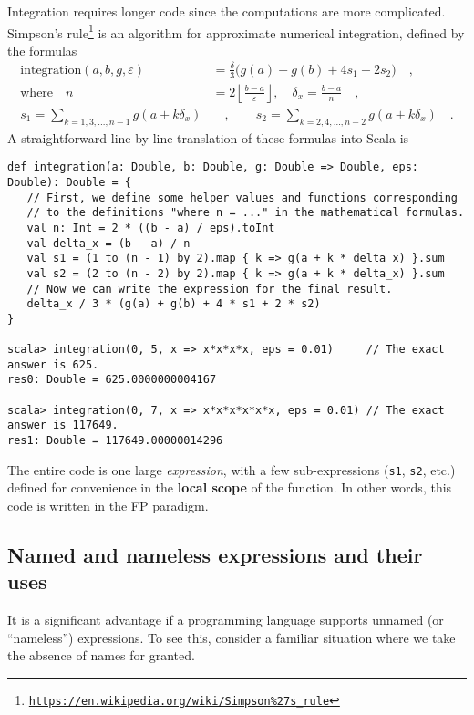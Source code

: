 Integration requires longer code since the computations are more complicated.
Simpson\textsf{'}s rule\footnote{\texttt{\href{https://en.wikipedia.org/wiki/Simpson\%27s_rule}{https://en.wikipedia.org/wiki/Simpson\%27s\_rule}}}
is an algorithm for approximate numerical integration, defined by
the formulas
\begin{align*}
\text{integration}\left(a,b,g,\varepsilon\right) & =\frac{\delta}{3}\big(g(a)+g(b)+4s_{1}+2s_{2}\big)\quad,\\
\text{where }~~~n & =2\left\lfloor \frac{b-a}{\varepsilon}\right\rfloor ,\quad\delta_{x}=\frac{b-a}{n}\quad,\\
s_{1}=\sum_{k=1,3,...,n-1}g(a+k\delta_{x}) & \quad,\quad\quad s_{2}=\sum_{k=2,4,...,n-2}g(a+k\delta_{x})\quad.
\end{align*}
 A straightforward line-by-line translation of these formulas into
Scala is
\begin{lstlisting}
def integration(a: Double, b: Double, g: Double => Double, eps: Double): Double = {
   // First, we define some helper values and functions corresponding
   // to the definitions "where n = ..." in the mathematical formulas.
   val n: Int = 2 * ((b - a) / eps).toInt
   val delta_x = (b - a) / n
   val s1 = (1 to (n - 1) by 2).map { k => g(a + k * delta_x) }.sum
   val s2 = (2 to (n - 2) by 2).map { k => g(a + k * delta_x) }.sum
   // Now we can write the expression for the final result.
   delta_x / 3 * (g(a) + g(b) + 4 * s1 + 2 * s2)
}

scala> integration(0, 5, x => x*x*x*x, eps = 0.01)     // The exact answer is 625.
res0: Double = 625.0000000004167

scala> integration(0, 7, x => x*x*x*x*x*x, eps = 0.01) // The exact answer is 117649.
res1: Double = 117649.00000014296
\end{lstlisting}

The entire code is one large \emph{expression}, with a few sub-expressions
(\lstinline!s1!, \lstinline!s2!, etc.) defined for convenience in
the \textbf{local scope} of the function. In other
words, this code is written in the FP paradigm.

\subsection{Named and nameless expressions and their uses}

It is a significant advantage if a programming language supports unnamed
(or \textsf{``}nameless\textsf{''}) expressions. To see this, consider a familiar
situation where we take the absence of names for granted.

